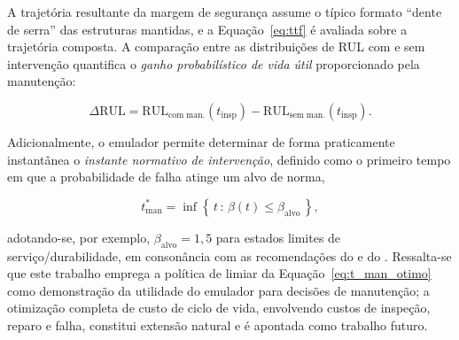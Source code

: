 A trajetória resultante da margem de segurança assume o típico formato ``dente de serra'' das estruturas mantidas, e a Equação~\eqref{eq:ttf} é avaliada sobre a trajetória composta. A comparação entre as distribuições de RUL com e sem intervenção quantifica o \textit{ganho probabilístico de vida útil} proporcionado pela manutenção:

\begin{equation}
\Delta \mathrm{RUL} = \mathrm{RUL}_{\mathrm{com\;man.}}(t_{\mathrm{insp}}) - \mathrm{RUL}_{\mathrm{sem\;man.}}(t_{\mathrm{insp}}).
\label{eq:delta_rul}
\end{equation}

Adicionalmente, o emulador permite determinar de forma praticamente instantânea o \textit{instante normativo de intervenção}, definido como o primeiro tempo em que a probabilidade de falha atinge um alvo de norma,

\begin{equation}
t_{\mathrm{man}}^{*} = \inf\left\{\, t \,:\, \beta(t) \leq \beta_{\mathrm{alvo}} \,\right\},
\label{eq:t_man_otimo}
\end{equation}

\noindent adotando-se, por exemplo, $\beta_{\mathrm{alvo}} = 1{,}5$ para estados limites de serviço/durabilidade, em consonância com as recomendações do \textcite{fib2006} e do \textcite{jcss2001}. Ressalta-se que este trabalho emprega a política de limiar da Equação~\eqref{eq:t_man_otimo} como demonstração da utilidade do emulador para decisões de manutenção; a otimização completa de custo de ciclo de vida, envolvendo custos de inspeção, reparo e falha, constitui extensão natural e é apontada como trabalho futuro.

